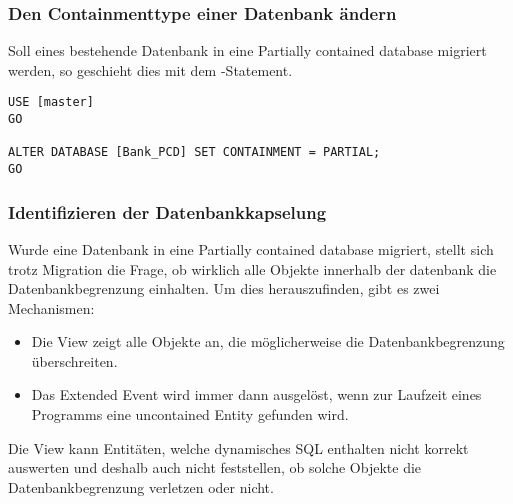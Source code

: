           \subsubsection{Den Containmenttype einer Datenbank ändern}
            Soll eines bestehende Datenbank in eine Partially contained
            database migriert werden, so geschieht dies mit dem
            -Statement.
            \begin{lstlisting}[language=ms_sql,caption={Migration einer Datenbank in eine teilweise eigen\-stän\-dige Daten\-bank},label=sql20_03]
USE [master]
GO

ALTER DATABASE [Bank_PCD] SET CONTAINMENT = PARTIAL;
GO
            \end{lstlisting}
            \begin{literaturinternet}
              \item \cite{hh534404}
            \end{literaturinternet}
          \subsubsection{Identifizieren der Datenbankkapselung}
            Wurde eine Datenbank in eine Partially contained database migriert,
            stellt sich trotz Migration die Frage, ob wirklich alle Objekte
            innerhalb der datenbank die Datenbankbegrenzung einhalten. Um dies
            herauszufinden, gibt es zwei Mechanismen:
            \begin{itemize}
              \item Die View 
              zeigt alle Objekte an, die möglicherweise die Datenbankbegrenzung
              überschreiten.
              \item Das Extended Event 
              wird immer dann ausgelöst, wenn zur Laufzeit eines Programms eine
              uncontained Entity gefunden wird.
            \end{itemize}
            \begin{merke}
              Die View  kann
              Entitäten, welche dynamisches SQL enthalten nicht korrekt
              auswerten und deshalb auch nicht feststellen, ob solche Objekte
              die Datenbankbegrenzung verletzen oder nicht.
            \end{merke}
            \begin{literaturinternet}
              \item \cite{ff929071}
            \end{literaturinternet}
